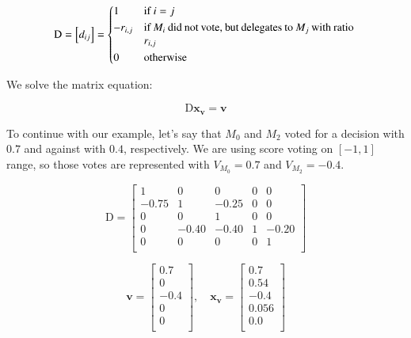 \documentclass{sigchi}
\begin{document}
\begin{displaymath}
\mathrm{D} = \left[d_{ij}\right] = \begin{dcases*}
 1 & if $i = j$ \\
 -r_{i,j} & \parbox[t]{.55\columnwidth}{if $M_i$ did not vote, but delegates to $M_j$ with ratio $r_{i,j}$} \\
 0 & otherwise \\
\end{dcases*}
\end{displaymath}

We solve the matrix equation:

\begin{displaymath}
\mathrm{D} \mathbf{x_v} = \mathbf{v}
\end{displaymath}

To continue with our example, let's say that $M_0$ and $M_2$ voted for a decision with $0.7$ and against with $0.4$,
respectively.
We are using score voting on $[-1, 1]$ range, so those votes are represented with $V_{M_0} = 0.7$ and
$V_{M_2} = -0.4$.

\begin{displaymath}
\mathrm{D} = \left[ \begin{array}{ccccc}
1 & 0 & 0 & 0 & 0 \\
-0.75 & 1 & -0.25 & 0 & 0 \\
0 & 0 & 1 & 0 & 0 \\
0 & -0.40 & -0.40 & 1 & -0.20 \\
0 & 0 & 0 & 0 & 1 \\
\end{array} \right]
\end{displaymath}

\begin{displaymath}
\mathbf{v} = \left[ \begin{array}{c}
0.7 \\
0 \\
-0.4 \\
0 \\
0 \\
\end{array} \right],\quad \mathbf{x_v} = \left[ \begin{array}{c}
0.7 \\
0.54 \\
-0.4 \\
0.056 \\
0.0 \\
\end{array} \right]
\end{displaymath}
\end{document}
